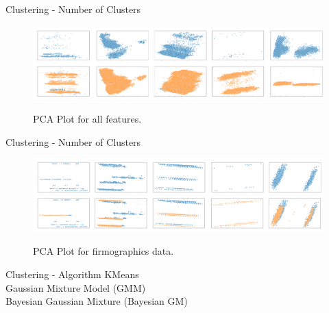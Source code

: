 
\begin{frame}{Clustering - Number of Clusters}
    \begin{figure}
        \centering
        \caption{PCA Plot for all features.} 
        \includegraphics[width=\linewidth]{fig/ch3-pca-plot-all-features.png}
        \label{fig:pca-plot:all-features}
    \end{figure}
\end{frame}


\begin{frame}{Clustering - Number of Clusters} 
    \begin{figure}
        \caption{PCA Plot for firmographics data.}
        \centering
        \includegraphics[width=\linewidth]{fig/ch3-pca-plot-firmographics.png}
        \label{fig:pca-plot:firmographics}
    \end{figure}
\end{frame}

%

\begin{frame}{Clustering - Algorithm} \pause
    KMeans \\  
    \vspace{0.5cm}
    Gaussian Mixture Model (GMM) \\ 
    \vspace{0.5cm}
    Bayesian Gaussian Mixture (Bayesian GM) \\
    \vspace{0.5cm}
     \\
    \vspace{0.5cm}
     \\
    \vspace{0.5cm}
\end{frame}

